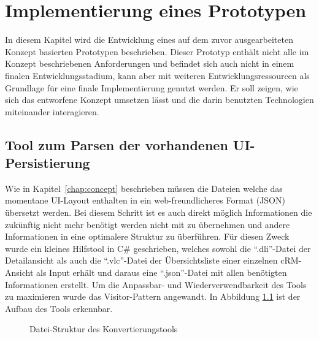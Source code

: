 \chapter{Implementierung eines Prototypen}\label{chap:implementation}

In diesem Kapitel wird die Entwicklung eines auf dem zuvor ausgearbeiteten Konzept basierten Prototypen beschrieben. Dieser Prototyp enthält nicht alle im Konzept beschriebenen Anforderungen und befindet sich auch nicht in einem finalen Entwicklungsstadium, kann aber mit weiteren Entwicklungsressourcen als Grundlage für eine finale Implementierung genutzt werden. Er soll zeigen, wie sich das entworfene Konzept umsetzen lässt und die darin benutzten Technologien miteinander interagieren.

\section{Tool zum Parsen der vorhandenen UI-Persistierung}

Wie in Kapitel~\ref{chap:concept} beschrieben müssen die Dateien welche das momentane UI-Layout enthalten in ein web-freundlicheres Format (JSON) übersetzt werden. Bei diesem Schritt ist es auch direkt möglich Informationen die zukünftig nicht mehr benötigt werden nicht mit zu übernehmen und andere Informationen in eine optimalere Struktur zu überführen. Für diesen Zweck wurde ein kleines Hilfstool in C\# geschrieben, welches sowohl die ``.dli''-Datei der Detailansicht als auch die ``.vlc''-Datei der Übersichtsliste einer einzelnen cRM-Ansicht als Input erhält und daraus eine ``.json''-Datei mit allen benötigten Informationen erstellt. Um die Anpassbar- und Wiederverwendbarkeit des Tools zu maximieren wurde das Visitor-Pattern  angewandt. In Abbildung \ref{fig:web-conv_file-tree} ist der Aufbau des Tools erkennbar.

\begin{figure}
    \centering
    \captionsetup{justification=centering}
        \caption{Datei-Struktur des Konvertierungstools}
        \label{fig:web-conv_file-tree}
\end{figure}

